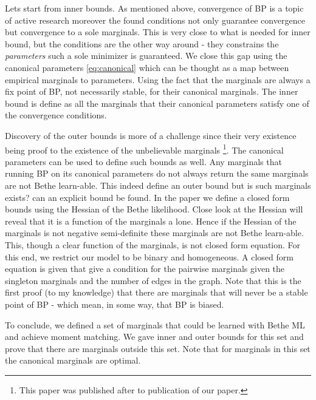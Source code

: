 {{{Lets start from inner bounds.
As mentioned above, convergence of BP is a topic of active research moreover the found conditions not only guarantee convergence but convergence to a sole marginals.
This is very close to what is needed for inner bound, but the conditions are the other way around - they constrains the \textit{parameters} such a sole minimizer is guaranteed.
We close this gap using the canonical parameters \eqref{eq:canonical} which can be thought as a map between empirical marginals to parameters.
Using the fact that the marginals are always a fix point of BP, not necessarily stable, for their canonical marginals.
The inner bound is define as all the marginals that their canonical parameters satisfy one of the convergence conditions.

Discovery of the outer bounds is more of a challenge since their very existence being proof to the existence of the unbelievable marginals \cite{pitkow2011learning}\footnote{This paper was published after to publication of our paper.}.
The canonical parameters can be used to define such bounds as well.
Any marginals that running BP on its canonical parameters do not always return the same marginals are not Bethe learn-able.
This indeed define an outer bound but is such marginals exists? can an explicit bound be found.
In the paper we define a closed form bounds using the Hessian of the Bethe likelihood.
Close look at the Hessian will reveal that it is a function of the marginals a lone.
Hence if the Hessian of the marginals is not negative semi-definite these marginals are not Bethe learn-able.
This, though a clear function of the marginals, is not closed form equation.
For this end, we restrict our model to be binary and homogeneous. 
A closed form equation is given that give a condition for the pairwise marginals given the singleton marginals and the number of edges in the graph.
Note that this is the first proof (to my knowledge) that there are marginals that will never be a stable point of BP - which mean, in some way, that BP is biased.

To conclude, we defined a set of marginals that could be learned with Bethe ML and achieve moment matching.
We gave inner and outer bounds for this set and prove that there are marginals outside this set.
Note that for marginals in this set the canonical marginals are optimal.  

}}}
